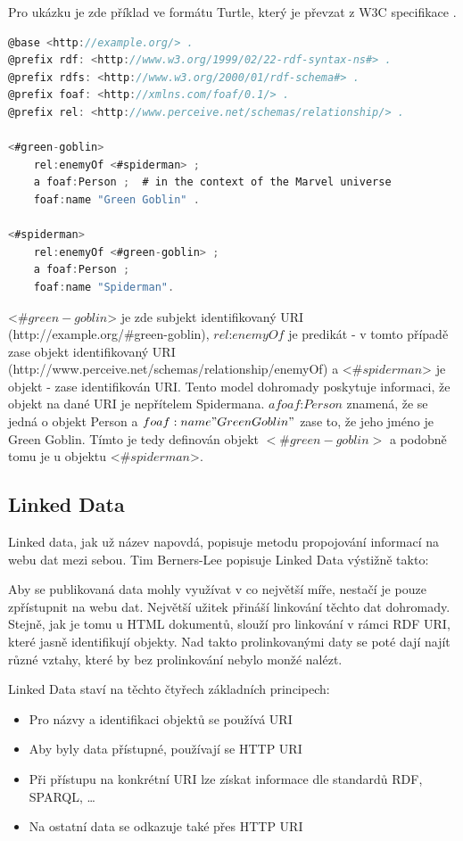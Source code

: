 \documentclass[thesis=B,czech]{FITthesis}[2012/06/26]
\begin{document}
 Pro ukázku je zde příklad ve formátu Turtle, který je převzat z W3C specifikace \cite{turtle_example}.
 \begin{lstlisting}[language=C, basicstyle=\small]
@base <http://example.org/> .
@prefix rdf: <http://www.w3.org/1999/02/22-rdf-syntax-ns#> .
@prefix rdfs: <http://www.w3.org/2000/01/rdf-schema#> .
@prefix foaf: <http://xmlns.com/foaf/0.1/> .
@prefix rel: <http://www.perceive.net/schemas/relationship/> .

<#green-goblin>
    rel:enemyOf <#spiderman> ;
    a foaf:Person ;  # in the context of the Marvel universe
    foaf:name "Green Goblin" .

<#spiderman>
    rel:enemyOf <#green-goblin> ;
    a foaf:Person ;
    foaf:name "Spiderman".
\end{lstlisting}
<$\#green-goblin$> je zde subjekt identifikovaný URI (http://example.org/\#green-goblin),
$rel$:$enemyOf$ je predikát - v tomto případě zase objekt identifikovaný URI (http://www.perceive.net/schemas/relationship/enemyOf) a 
 <$\#spiderman$> je objekt - zase identifikován URI.
 Tento model dohromady poskytuje informaci, že objekt na dané URI je nepřítelem Spidermana. $a foaf$:$Person$ znamená, že
 se jedná o objekt Person a $foaf:name "Green Goblin"$ zase to, že jeho jméno je Green Goblin. Tímto je tedy definován objekt $<\#green-goblin>$ a podobně tomu je u 
 objektu <$\#spiderman$>.
 
 \subsection{Linked Data}
  Linked data, jak už název napovdá, popisuje metodu propojování informací na webu dat mezi sebou.  
  Tim Berners-Lee popisuje Linked Data výstižně takto: 
   \cite{TimBL_LD}
  
  Aby se publikovaná data mohly využívat v co největší míře, nestačí je pouze zpřístupnit na webu dat. Největší užitek přináší linkování těchto dat dohromady.
  Stejně, jak je tomu u HTML dokumentů, slouží pro linkování v rámci RDF URI, které jasně identifikují objekty. Nad takto prolinkovanými daty se poté dají
  najít různé vztahy, které by bez prolinkování nebylo monžé nalézt.
  
  Linked Data staví na těchto čtyřech základních principech:
  \begin{itemize}
   \item Pro názvy a identifikaci objektů se používá URI
   \item Aby byly data přístupné, používají se HTTP URI
   \item Při přístupu na konkrétní URI lze získat informace dle standardů RDF, SPARQL, \ldots
   \item Na ostatní data se odkazuje také přes HTTP URI
  \end{itemize}
  
\end{document}

